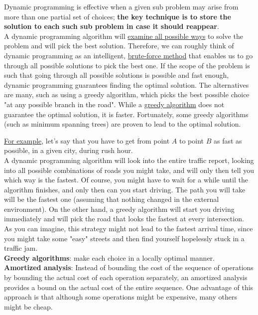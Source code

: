 \documentclass{article}
\begin{document}
Dynamic programming is effective when a given sub problem may arise from more than one partial set of choices; \textbf{the key technique is to store the solution to each such sub problem in case it should reappear}.\\
A dynamic programming algorithm will \underline{examine all possible ways} to solve the problem and will pick the best solution. Therefore, we can roughly think of dynamic programming as an intelligent, \underline{brute-force method} that enables us to go through all possible solutions to pick the best one. If the scope of the problem is such that going through all possible solutions is possible and fast enough, dynamic programming guarantees finding the optimal solution. The alternatives are many, such as using a greedy algorithm, which picks the best possible choice "at any possible branch in the road". While a \underline{greedy algorithm} does not guarantee the optimal solution, it is faster. Fortunately, some greedy algorithms (such as minimum spanning trees) are proven to lead to the optimal solution.

\underline{For example}, let's say that you have to get from point $A$ to point $B$ as fast as possible, in a given city, during rush hour. \\
A dynamic programming algorithm will look into the entire traffic report, looking into all possible combinations of roads you might take, and will only then tell you which way is the fastest. Of course, you might have to wait for a while until the algorithm finishes, and only then can you start driving. The path you will take will be the fastest one (assuming that nothing changed in the external environment). On the other hand, a greedy algorithm will start you driving immediately and will pick the road that looks the fastest at every intersection. \\
As you can imagine, this strategy might not lead to the fastest arrival time, since you might take some "easy" streets and then find yourself hopelessly stuck in a traffic jam.\\

\noindent
\textbf{Greedy algorithms}: make each choice in a locally optimal manner.\\
\textbf{Amortized analysis}: Instead of bounding the cost of the sequence of operations by bounding the actual cost of each operation separately, an amortized analysis provides a bound on the actual cost of the entire sequence. One advantage of this approach is that although some operations might be expensive, many others might be cheap.
\end{document}
